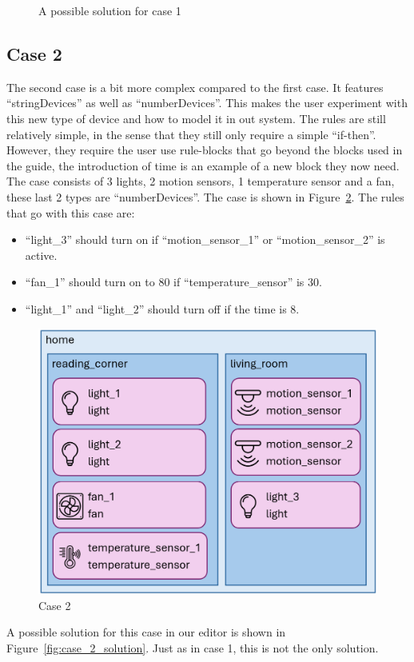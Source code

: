 \documentclass[11pt,a4paper]{report}
\begin{document}
\begin{idplisting}
\begin{figure}
    \caption{A possible solution for case 1}
    \label{fig:case_1_solution} 
\end{figure}

\subsection{Case 2}
The second case is a bit more complex compared to the first case. It features ``stringDevices'' as well as ``numberDevices''. This makes the user experiment with this new type of device and how to model it in out system. The rules are still relatively simple, in the sense that they still only require a simple ``if-then''. However, they require the user use rule-blocks that go beyond the blocks used in the guide, the introduction of time is an example of a new block they now need. The case consists of 3 lights, 2 motion sensors, 1 temperature sensor and a fan, these last 2 types are ``numberDevices''. The case is shown in Figure~\ref{fig:case_2}. The rules that go with this case are:
\begin{itemize}
    \item ``light\_3'' should turn on if ``motion\_sensor\_1'' or ``motion\_sensor\_2'' is active.
    \item ``fan\_1'' should turn on to 80 if ``temperature\_sensor'' is 30.
    \item ``light\_1'' and ``light\_2'' should turn off if the time is 8.
\end{itemize}
\begin{figure}
    \centering
    \includegraphics[width=0.8\linewidth]{images/case_2.png}
    \caption{Case 2}
    \label{fig:case_2}
\end{figure}
A possible solution for this case in our editor is shown in Figure~\ref{fig:case_2_solution}. Just as in case 1, this is not the only solution.

\end{idplisting}
\end{document}
